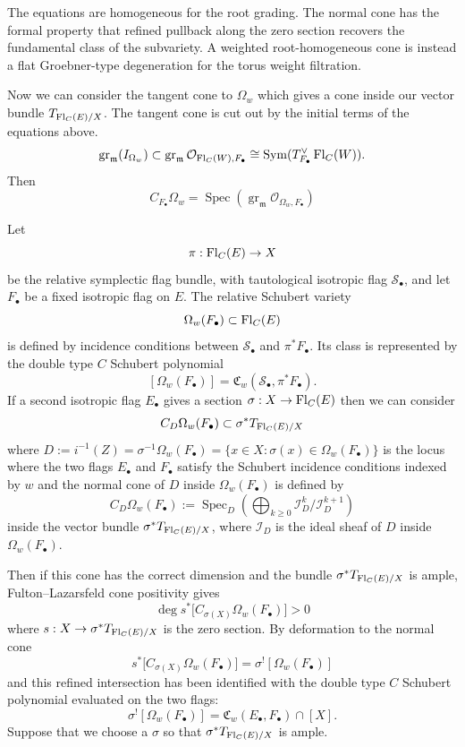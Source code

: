 \documentclass[12pt]{article}
\begin{document}
The equations are homogeneous for the root grading. The normal cone has the formal property that refined pullback along the zero section recovers the fundamental class of the subvariety. A weighted root-homogeneous cone is instead a flat Groebner-type degeneration for the torus weight filtration.

Now we can consider the tangent cone to $\Omega_w$ which gives a cone inside our vector bundle $T_{\operatorname{Fl}_C(E)/X}$. The tangent cone is cut out by the initial terms of the equations above. \[
\operatorname{gr}_{\mathfrak m}(I_{\Omega_w})
\subset
\operatorname{gr}_{\mathfrak m}\mathcal O_{\operatorname{Fl}_C(W),F_\bullet}
\cong
\operatorname{Sym}(T_{F_\bullet}^\vee\operatorname{Fl}_C(W)).
\]
Then \[C_{F_\bullet}\Omega_w
=
\operatorname{Spec}
\left(
\operatorname{gr}_{\mathfrak m}\mathcal O_{\Omega_w,F_\bullet}
\right)\]

Let
\[
    \pi:\operatorname{Fl}_C(E)\to X
\]
be the relative symplectic flag bundle, with tautological isotropic flag
\(\mathcal S_\bullet\), and let \(F_\bullet\) be a fixed isotropic flag on
\(E\).  The relative Schubert variety
\[
    \Omega_w(F_\bullet)\subset \operatorname{Fl}_C(E)
\]
is defined by incidence conditions between \(\mathcal S_\bullet\) and
\(\pi^*F_\bullet\).  Its class is represented by the double type \(C\)
Schubert polynomial
\[
    [\Omega_w(F_\bullet)]
    =
    \mathfrak C_w(\mathcal S_\bullet,\pi^*F_\bullet).
\]
If a second isotropic flag \(E_\bullet\) gives a section $\sigma:X\to \operatorname{Fl}_C(E)$ then we can consider \[C_{D}\Omega_w(F_\bullet) \subset \sigma^*T_{\operatorname{Fl}_C(E)/X}\] where $
D:=i^{-1}(Z)=\sigma^{-1}\Omega_w(F_\bullet)=\{x\in X:\sigma(x)\in \Omega_w(F_\bullet)\}$ is the locus where the two flags $E_\bullet$ and $F_\bullet$ satisfy the Schubert incidence conditions indexed by $w$ and the normal cone of $D$ inside $\Omega_w(F_\bullet)$ is defined by
\[
C_D\Omega_w(F_\bullet)
:=
\operatorname{Spec}_D
\left(
\bigoplus_{k\ge 0}
\mathcal I_D^k/\mathcal I_D^{k+1}
\right)\]
inside the vector bundle $\sigma^*T_{\operatorname{Fl}_C(E)/X}$, where $ \mathcal I_D $ is the ideal sheaf of $D$ inside $\Omega_w(F_\bullet)$.

Then if this cone has the correct dimension and the bundle $\sigma^*T_{\operatorname{Fl}_C(E)/X}$ is ample, Fulton--Lazarsfeld cone positivity gives
\[\deg s^*\bigl[C_{\sigma(X)}\Omega_w(F_\bullet)\bigr] >0\]
where $s:X\to \sigma^*T_{\operatorname{Fl}_C(E)/X}$
is the zero section. By deformation to the normal cone\[
s^*\bigl[C_{\sigma(X)}\Omega_w(F_\bullet)\bigr]
=
\sigma^![\Omega_w(F_\bullet)]\]
and this refined intersection has been identified with the double type \(C\) Schubert polynomial evaluated on the two flags:
\[
\sigma^![\Omega_w(F_\bullet)]
=
\mathfrak C_w(E_\bullet,F_\bullet)\cap [X].
\]
Suppose that we choose a $\sigma$ so that $\sigma^*T_{\operatorname{Fl}_C(E)/X}$ is ample. 
\end{document}
